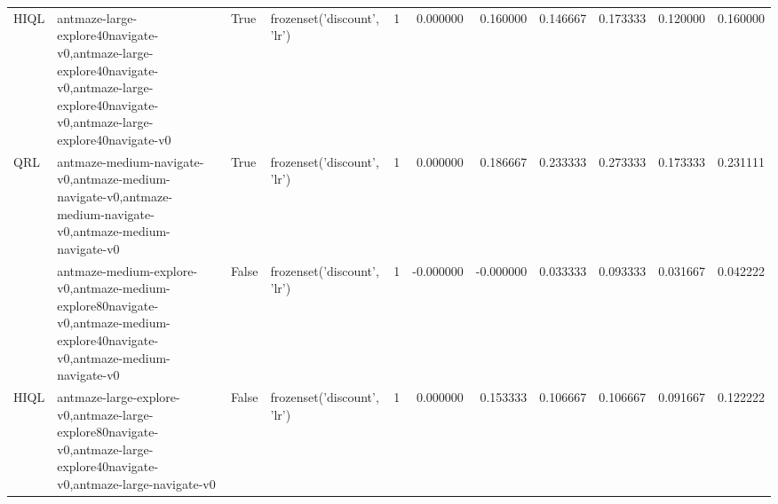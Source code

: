 \begin{tabular}{llllrrrrrrr}
\cline{1-11} \cline{2-11} \cline{3-11}
HIQL & antmaze-large-explore40navigate-v0,antmaze-large-explore40navigate-v0,antmaze-large-explore40navigate-v0,antmaze-large-explore40navigate-v0 & True & frozenset({'discount', 'lr'}) & 1 & 0.000000 & 0.160000 & 0.146667 & 0.173333 & 0.120000 & 0.160000 \\
\cline{1-11} \cline{2-11} \cline{3-11}
\multirow[t]{2}{*}{QRL} & antmaze-medium-navigate-v0,antmaze-medium-navigate-v0,antmaze-medium-navigate-v0,antmaze-medium-navigate-v0 & True & frozenset({'discount', 'lr'}) & 1 & 0.000000 & 0.186667 & 0.233333 & 0.273333 & 0.173333 & 0.231111 \\
\cline{2-11} \cline{3-11}
 & antmaze-medium-explore-v0,antmaze-medium-explore80navigate-v0,antmaze-medium-explore40navigate-v0,antmaze-medium-navigate-v0 & False & frozenset({'discount', 'lr'}) & 1 & -0.000000 & -0.000000 & 0.033333 & 0.093333 & 0.031667 & 0.042222 \\
\cline{1-11} \cline{2-11} \cline{3-11}
HIQL & antmaze-large-explore-v0,antmaze-large-explore80navigate-v0,antmaze-large-explore40navigate-v0,antmaze-large-navigate-v0 & False & frozenset({'discount', 'lr'}) & 1 & 0.000000 & 0.153333 & 0.106667 & 0.106667 & 0.091667 & 0.122222 \\
\cline{1-11} \cline{2-11} \cline{3-11}
\bottomrule
\end{tabular}
